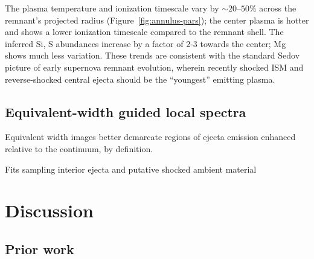 \documentclass[preprint2,tighten,trackchanges]{aastex6}
\newcommand*{\abt}{\mathord{\sim}} %
\begin{document}
The plasma temperature and ionization timescale vary by $\abt 20$--$50\%$
across the remnant's projected radius (Figure~\ref{fig:annulus-pars});
the center plasma is hotter and shows a lower ionization timescale compared to
the remnant shell.
The inferred Si, S abundances increase by a factor of $2$-$3$ towards the
center; Mg shows much less variation.
These trends are consistent with the standard Sedov picture of early supernova
remnant evolution, wherein recently shocked ISM and reverse-shocked central
ejecta should be the ``youngest'' emitting plasma.


\subsection{Equivalent-width guided local spectra}


Equivalent width images better demarcate regions of ejecta emission enhanced
relative to the continuum, by definition.

\begin{figure*}[]
    \label{fig:bar-lobe-ridge-fits}
\end{figure*}

\begin{table}[!ht]
    \centering
    \caption{Fits sampling interior ejecta and putative shocked ambient material
        \label{tab:bar-lobe-ridge-fits}}
    \footnotesize
    
\end{table}


\section{Discussion} \label{sec:disc}

\subsection{Prior work}
\end{document}
